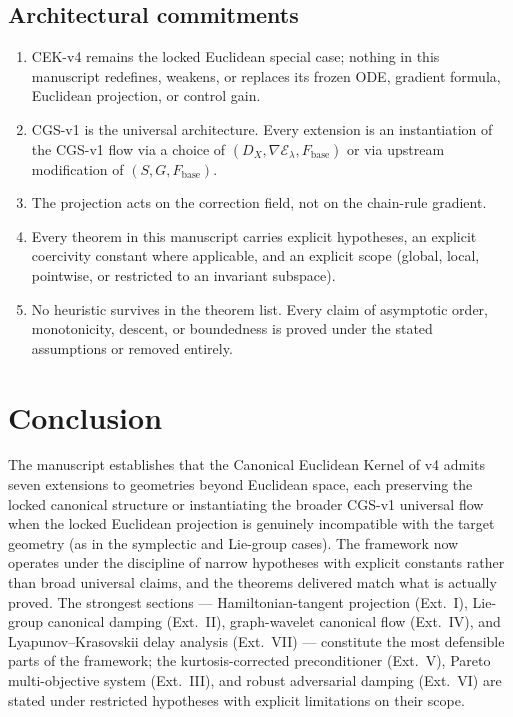 \documentclass[11pt,a4paper]{article}
\theoremstyle{definition}
\newcommand{\Fbase}{F_{\mathrm{base}}}
\begin{document}
\subsection{Architectural commitments}

\begin{enumerate}[leftmargin=2em]
\item CEK-v4 remains the locked Euclidean special case; nothing in this manuscript redefines, weakens, or replaces its frozen ODE, gradient formula, Euclidean projection, or control gain.
\item CGS-v1 is the universal architecture. Every extension is an instantiation of the CGS-v1 flow via a choice of $(D_X, \nabla \mathcal{E}_\lambda, \Fbase)$ or via upstream modification of $(S, G, \Fbase)$.
\item The projection acts on the correction field, not on the chain-rule gradient.
\item Every theorem in this manuscript carries explicit hypotheses, an explicit coercivity constant where applicable, and an explicit scope (global, local, pointwise, or restricted to an invariant subspace).
\item No heuristic survives in the theorem list. Every claim of asymptotic order, monotonicity, descent, or boundedness is proved under the stated assumptions or removed entirely.
\end{enumerate}

\section{Conclusion}

The manuscript establishes that the Canonical Euclidean Kernel of v4 admits seven extensions to geometries beyond Euclidean space, each preserving the locked canonical structure or instantiating the broader CGS-v1 universal flow when the locked Euclidean projection is genuinely incompatible with the target geometry (as in the symplectic and Lie-group cases). The framework now operates under the discipline of narrow hypotheses with explicit constants rather than broad universal claims, and the theorems delivered match what is actually proved. The strongest sections --- Hamiltonian-tangent projection (Ext.~I), Lie-group canonical damping (Ext.~II), graph-wavelet canonical flow (Ext.~IV), and Lyapunov--Krasovskii delay analysis (Ext.~VII) --- constitute the most defensible parts of the framework; the kurtosis-corrected preconditioner (Ext.~V), Pareto multi-objective system (Ext.~III), and robust adversarial damping (Ext.~VI) are stated under restricted hypotheses with explicit limitations on their scope.
\end{document}
